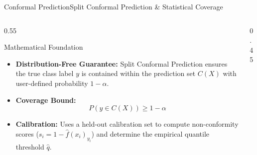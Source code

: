 \begin{frame}{Conformal Prediction}{Split Conformal Prediction \& Statistical Coverage}
    \begin{columns}[T]
        \begin{column}{0.55\textwidth}
            \begin{block}{Mathematical Foundation}\small
                \begin{itemize}
                    \item \textbf{Distribution-Free Guarantee:} Split Conformal Prediction ensures the true class label $y$ is contained within the prediction set $C(X)$ with user-defined probability $1 - \alpha$.
                    \item \textbf{Coverage Bound:}
                    \[
                        P(y \in C(X)) \ge 1 - \alpha
                    \]
                    \item \textbf{Calibration:} Uses a held-out calibration set to compute non-conformity scores ($s_i = 1 - \hat{f}(x_i)_{y_i}$) and determine the empirical quantile threshold $\hat{q}$.
                \end{itemize}
            \end{block}
        \end{column}
        \begin{column}{0.45\textwidth}
            \begin{center}
\end{center}
\end{column}
\end{columns}
\end{frame}

